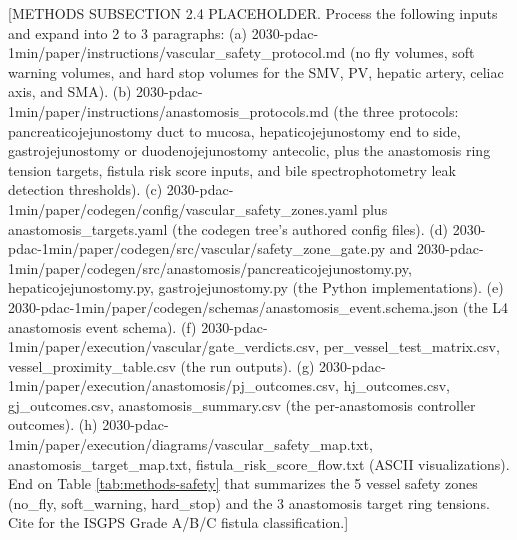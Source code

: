 [METHODS SUBSECTION 2.4 PLACEHOLDER. Process the following inputs and expand into 2 to 3 paragraphs:
(a) 2030-pdac-1min/paper/instructions/vascular_safety_protocol.md (no fly volumes, soft warning volumes, and hard stop volumes for the SMV, PV, hepatic artery, celiac axis, and SMA).
(b) 2030-pdac-1min/paper/instructions/anastomosis_protocols.md (the three protocols: pancreaticojejunostomy duct to mucosa, hepaticojejunostomy end to side, gastrojejunostomy or duodenojejunostomy antecolic, plus the anastomosis ring tension targets, fistula risk score inputs, and bile spectrophotometry leak detection thresholds).
(c) 2030-pdac-1min/paper/codegen/config/vascular_safety_zones.yaml plus anastomosis_targets.yaml (the codegen tree's authored config files).
(d) 2030-pdac-1min/paper/codegen/src/vascular/safety_zone_gate.py and 2030-pdac-1min/paper/codegen/src/anastomosis/{pancreaticojejunostomy.py, hepaticojejunostomy.py, gastrojejunostomy.py} (the Python implementations).
(e) 2030-pdac-1min/paper/codegen/schemas/anastomosis_event.schema.json (the L4 anastomosis event schema).
(f) 2030-pdac-1min/paper/execution/vascular/{gate_verdicts.csv, per_vessel_test_matrix.csv, vessel_proximity_table.csv} (the run outputs).
(g) 2030-pdac-1min/paper/execution/anastomosis/{pj_outcomes.csv, hj_outcomes.csv, gj_outcomes.csv, anastomosis_summary.csv} (the per-anastomosis controller outcomes).
(h) 2030-pdac-1min/paper/execution/diagrams/{vascular_safety_map.txt, anastomosis_target_map.txt, fistula_risk_score_flow.txt} (ASCII visualizations).
End on Table \ref{tab:methods-safety} that summarizes the 5 vessel safety zones (no_fly, soft_warning, hard_stop) and the 3 anastomosis target ring tensions. Cite \cite{Bassi2017ISGPSPostOpFistula} for the ISGPS Grade A/B/C fistula classification.]

